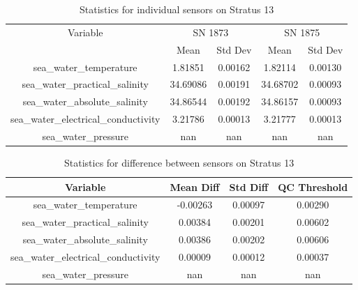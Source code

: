 \begin{table}[h]
\centering
\begin{tabular}{|c|c|c|c|c|}
\hline
Variable & \multicolumn{2}{c|}{SN 1873} & \multicolumn{2}{c|}{SN 1875} \\
& Mean & Std Dev & Mean & Std Dev \\
\hline
sea\_water\_temperature & 1.81851 & 0.00162 & 1.82114 & 0.00130 \\
sea\_water\_practical\_salinity & 34.69086 & 0.00191 & 34.68702 & 0.00093 \\
sea\_water\_absolute\_salinity & 34.86544 & 0.00192 & 34.86157 & 0.00093 \\
sea\_water\_electrical\_conductivity & 3.21786 & 0.00013 & 3.21777 & 0.00013 \\
sea\_water\_pressure & nan & nan & nan & nan \\
\hline
\end{tabular}
\caption{Statistics for individual sensors on Stratus 13}
\end{table}

\begin{table}[h]
\centering
\begin{tabular}{|c|c|c|c|}
\hline
Variable & Mean Diff & Std Diff & QC Threshold \\
\hline
sea\_water\_temperature & -0.00263 & 0.00097 & 0.00290 \\
sea\_water\_practical\_salinity & 0.00384 & 0.00201 & 0.00602 \\
sea\_water\_absolute\_salinity & 0.00386 & 0.00202 & 0.00606 \\
sea\_water\_electrical\_conductivity & 0.00009 & 0.00012 & 0.00037 \\
sea\_water\_pressure & nan & nan & nan \\
\hline
\end{tabular}
\caption{Statistics for difference between sensors on Stratus 13}
\end{table}
